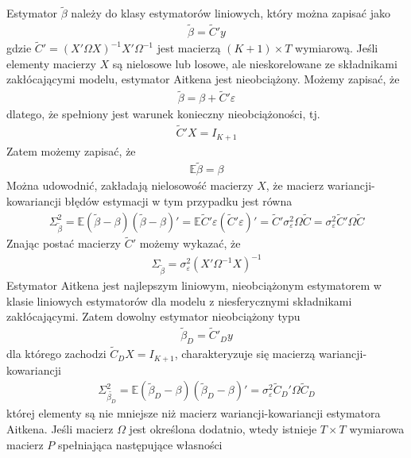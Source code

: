 Estymator $ \tilde \beta  $ należy do klasy estymatorów liniowych, który można zapisać jako
\begin{gather*}
\tilde \beta=\tilde C'y
\end{gather*}
gdzie $ \tilde C'=\left(X'\Omega X\right)^{-1}X'\Omega^{-1} $ jest macierzą $ (K+1)\times T $ wymiarową.
Jeśli elementy macierzy $ X $ są nielosowe lub losowe, ale nieskorelowane ze składnikami zakłócającymi modelu, estymator Aitkena jest nieobciążony. Możemy zapisać, że
\begin{gather*}
\tilde \beta=\beta+\tilde C'\varepsilon
\end{gather*}
dlatego, że spełniony jest warunek konieczny nieobciążoności, tj.
\begin{gather*}
\tilde C'X=I_{K+1}
\end{gather*}
Zatem możemy zapisać, że
\begin{gather*}
\mathbb E \tilde \beta=\beta 
\end{gather*}
Można udowodnić, zakładają nielosowość macierzy $ X $, że macierz wariancji-kowariancji błędów estymacji w tym przypadku jest równa
\begin{gather*}
\Sigma^2_{\tilde {\beta }}=
\mathbb E \left(\tilde \beta-\beta\right)\left(\tilde \beta-\beta\right)'=
\mathbb E \tilde C'\varepsilon\left(\tilde C'\varepsilon\right)'=
\tilde C'\sigma^2_\varepsilon\Omega\tilde C=
\sigma^2_\varepsilon\tilde C'\Omega\tilde C
\end{gather*}
Znając postać macierzy $ \tilde C' $ możemy wykazać, że
\begin{gather*}
\Sigma_{\tilde \beta}=\sigma^2_\varepsilon \left(X'\Omega^{-1}X\right)^{-1}
\end{gather*}
Estymator Aitkena jest najlepszym liniowym, nieobciążonym estymatorem w klasie liniowych estymatorów dla modelu z niesferycznymi składnikami zakłócającymi. Zatem dowolny estymator nieobciążony typu
\begin{gather*}
\tilde \beta_D=\tilde C'_Dy
\end{gather*}
dla którego zachodzi $ \tilde C_DX=I_{K+1} $, charakteryzuje się macierzą wariancji-kowariancji
\begin{gather*}
\Sigma^2_{\tilde {\beta_D }}=
\mathbb E \left(\tilde \beta_D-\beta\right)\left(\tilde \beta_D-\beta\right)'=
\sigma^2_\varepsilon\tilde C_D'\Omega\tilde C_D
\end{gather*}
której elementy są nie mniejsze niż macierz wariancji-kowariancji estymatora Aitkena.
Jeśli macierz $ \Omega $ jest określona dodatnio, wtedy istnieje $ T\times T $ wymiarowa macierz $ P $ spełniająca następujące własności
